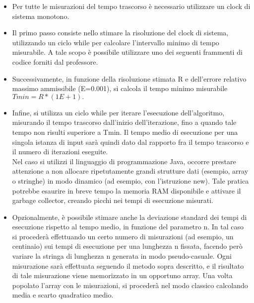 \begin{itemize}
    \item Per tutte le misurazioni del tempo trascorso è necessario utilizzare un clock di sistema monotono.
    \item Il primo passo consiste nello stimare la risoluzione del clock di sistema, utilizzando un ciclo while per calcolare l'intervallo minimo di tempo misurabile. A tale scopo è possibile utilizzare uno dei seguenti frammenti di codice forniti dal professore.
    \item Successivamente, in funzione della risoluzione stimata R e dell'errore relativo massimo ammissibile (E=0.001), si calcola il tempo minimo misurabile $Tmin=R*(1E+1).$
    \item Infine, si utilizza un ciclo while per iterare l'esecuzione dell'algoritmo, misurando il tempo trascorso dall'inizio dell'iterazione, fino a quando tale tempo non risulti superiore a Tmin. Il tempo medio di esecuzione per una singola istanza di input sarà quindi dato dal rapporto fra il tempo trascorso e il numero di iterazioni eseguite.\vspace{2mm}\\Nel caso si utilizzi il linguaggio di programmazione Java, occorre prestare attenzione a non allocare ripetutamente grandi strutture dati (esempio, array o stringhe) in modo dinamico (ad esempio, con l'istruzione new). Tale pratica potrebbe esaurire in breve tempo la memoria RAM disponibile e attivare il garbage collector, creando picchi nei tempi di esecuzione misurati.
    \item Opzionalmente, è possibile stimare anche la deviazione standard dei tempi di esecuzione rispetto al tempo medio, in funzione del parametro n. In tal caso si procederà effettuando un certo numero di misurazioni (ad esempio, un centinaio) sui tempi di esecuzione per una lunghezza n fissata, facendo però variare la stringa di lunghezza n generata in modo pseudo-casuale. Ogni misurazione sarà effettuata seguendo il metodo sopra descritto, e il risultato di tale misurazione viene memorizzato in un opportuno array. Una volta popolato l'array con le misurazioni, si procederà nel modo classico calcolando media e scarto quadratico medio.

\end{itemize}
